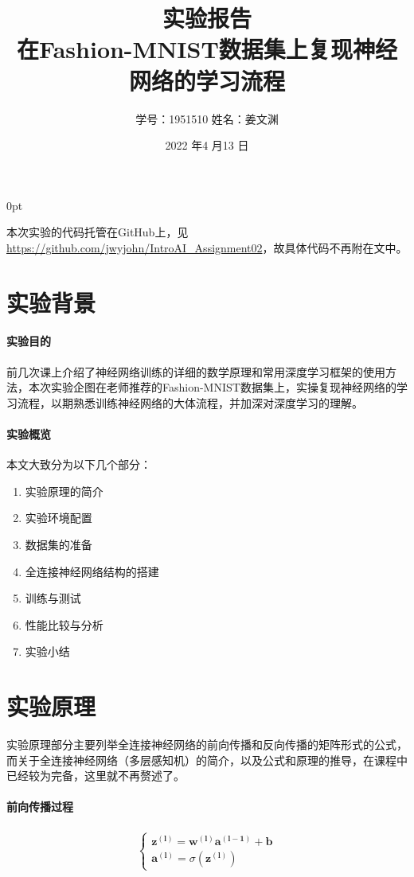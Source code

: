 \documentclass[cn,black,10pt,normal]{elegantnote}
\title{实验报告\\ \normalsize 在Fashion-MNIST数据集上复现神经网络的学习流程}
\author{学号：1951510 \hspace{30pt} 姓名：姜文渊}
\institute{Tongji University}
\date{2022 年4 月13 日}
\newcommand{\setParDef}{\setlength {\parskip} {0pt} }
\begin{document}
\setParDef
\maketitle

本次实验的代码托管在GitHub上，见\url{https://github.com/jwyjohn/IntroAI_Assignment02}，故具体代码不再附在文中。

\section{实验背景}

\paragraph{实验目的}前几次课上介绍了神经网络训练的详细的数学原理和常用深度学习框架的使用方法，本次实验企图在老师推荐的Fashion-MNIST数据集上，实操复现神经网络的学习流程，以期熟悉训练神经网络的大体流程，并加深对深度学习的理解。

\paragraph{实验概览}本文大致分为以下几个部分：
\begin{enumerate}
    \item 实验原理的简介
    \item 实验环境配置
    \item 数据集的准备
    \item 全连接神经网络结构的搭建
    \item 训练与测试
    \item 性能比较与分析
    \item 实验小结
\end{enumerate}

\section{实验原理}

实验原理部分主要列举全连接神经网络的前向传播和反向传播的矩阵形式的公式，而关于全连接神经网络（多层感知机）的简介，以及公式和原理的推导，在课程中已经较为完备，这里就不再赘述了。

\paragraph{前向传播过程}
\begin{equation}
    \begin{aligned} \begin{cases} \boldsymbol{z^{(l)}=w^{(l)}a^{(l-1)}+b}\\ \boldsymbol{a^{(l)}}=\sigma(\boldsymbol{z^{(l)}}) \end{cases} \end{aligned}
\end{equation}
\end{document}
